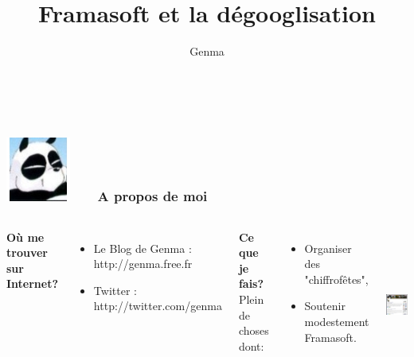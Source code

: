 \documentclass{beamer}
\title[Framasoft et la dégooglisation]{Framasoft et la dégooglisation}
\author{Genma}
\begin{document}
\begin{frame}
	\titlepage
	\vfill
	\begin{center}
		\\[2.5ex]
		{\tiny\CcNote{\CcLongnameByNcSa}}
		\vspace*{-2.5ex}
	\end{center}
\end{frame}



\begin{frame}
\frametitle{\includegraphics[scale=0.4]{./images/Genma.jpg} \ \ \  A propos de moi  }
\begin{columns}[c] 

\textbf{Où me trouver sur Internet?}
\begin{itemize}
\item Le Blog de Genma : http://genma.free.fr
\item Twitter : http://twitter.com/genma
\end{itemize}

\textbf{Ce que je fais?}
\\ Plein de choses dont:
\begin{itemize}
\item Organiser des "chiffrofêtes",
\item Soutenir modestement Framasoft.
\end{itemize}

\includegraphics[width=5cm,height=5cm]{./images/blog.png} 
\end{columns}
\end{frame}
\end{document}
